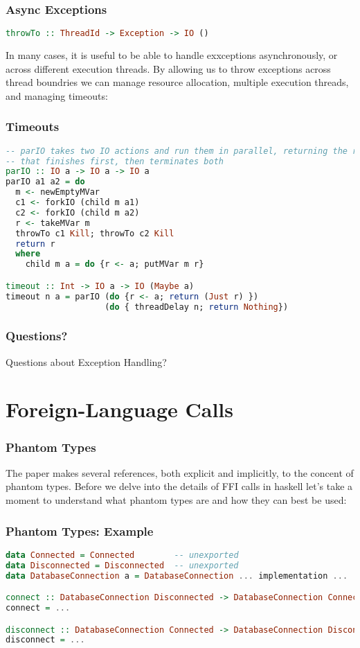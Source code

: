 \documentclass{beamer}
\begin{document}
\begin{frame}[fragile]
  \frametitle{Async Exceptions}
\begin{lstlisting}[language=haskell]
throwTo :: ThreadId -> Exception -> IO ()
\end{lstlisting}
  In many cases, it is useful to be able to handle exxceptions
  asynchronously, or across different execution threads.  By allowing
  us to throw exceptions across thread boundries we can manage
  resource allocation, multiple execution threads, and managing
  timeouts:
\end{frame}
\begin{frame}[fragile]
  \frametitle{Timeouts}
\begin{lstlisting}[language=haskell]
-- parIO takes two IO actions and run them in parallel, returning the result
-- that finishes first, then terminates both
parIO :: IO a -> IO a -> IO a
parIO a1 a2 = do
  m <- newEmptyMVar
  c1 <- forkIO (child m a1)
  c2 <- forkIO (child m a2)
  r <- takeMVar m
  throwTo c1 Kill; throwTo c2 Kill
  return r
  where
    child m a = do {r <- a; putMVar m r}

timeout :: Int -> IO a -> IO (Maybe a)
timeout n a = parIO (do {r <- a; return (Just r) })
                    (do { threadDelay n; return Nothing})
\end{lstlisting}
\end{frame}

\begin{frame}
  \frametitle{Questions?}
  Questions about Exception Handling?
\end{frame}

\section{Foreign-Language Calls}

\begin{frame}
  \frametitle{Phantom Types}
  The paper makes several references, both explicit and implicitly, to
  the concent of phantom types.  Before we delve into the details of
  FFI calls in haskell let's take a moment to understand what phantom
  types are and how they can best be used:
\end{frame}

\begin{frame}[fragile]
  \frametitle{Phantom Types: Example}
\begin{lstlisting}[language=haskell]
data Connected = Connected        -- unexported
data Disconnected = Disconnected  -- unexported
data DatabaseConnection a = DatabaseConnection ... implementation ...

connect :: DatabaseConnection Disconnected -> DatabaseConnection Connected
connect = ...

disconnect :: DatabaseConnection Connected -> DatabaseConnection Disconnected
disconnect = ...
\end{lstlisting}
\end{frame}
\end{document}
